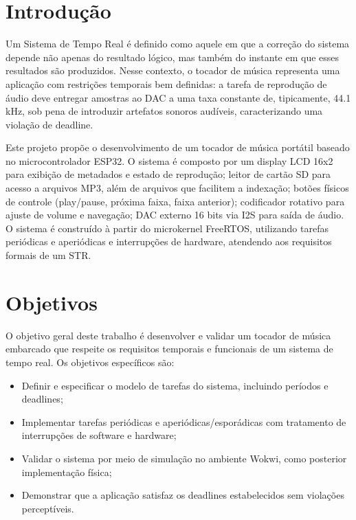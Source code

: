 \documentclass[conference]{IEEEtran}
\begin{document}
\section{Introdução}
Um Sistema de Tempo Real é definido como aquele em que a correção do sistema depende não
apenas do resultado lógico, mas também do instante em que
esses resultados são produzidos. Nesse contexto, o tocador de
música representa uma aplicação com restrições temporais bem definidas: a
tarefa de reprodução de áudio deve entregar amostras ao DAC a uma taxa
constante de, tipicamente, 44.1 kHz, sob pena de introduzir artefatos
sonoros audíveis, caracterizando uma violação de deadline.

Este projeto propõe o desenvolvimento de um tocador de música portátil baseado
no microcontrolador ESP32. O sistema
é composto por um display LCD 16x2 para exibição de metadados e estado de reprodução; leitor
de cartão SD para acesso a arquivos MP3, além de arquivos que facilitem a indexação; botões físicos de controle (play/pause,
próxima faixa, faixa anterior); codificador rotativo para ajuste de volume e
navegação; DAC externo 16 bits via I2S para saída de áudio. O sistema é construído
à partir do microkernel FreeRTOS, utilizando tarefas periódicas e aperiódicas e interrupções de hardware, atendendo aos
requisitos formais de um STR.

\section{Objetivos}

O objetivo geral deste trabalho é desenvolver e validar um tocador de música
embarcado que respeite os requisitos temporais e funcionais de um sistema de
tempo real. Os objetivos específicos são:

\begin{itemize}
    \item Definir e especificar o modelo de tarefas do sistema, incluindo
    períodos e deadlines;
    \item Implementar tarefas periódicas e aperiódicas/esporádicas com
    tratamento de interrupções de software e hardware;
    \item Validar o sistema por meio de simulação no ambiente Wokwi, como posterior implementação física;
    \item Demonstrar que a aplicação satisfaz os deadlines estabelecidos sem
    violações perceptíveis.
\end{itemize}
\end{document}
